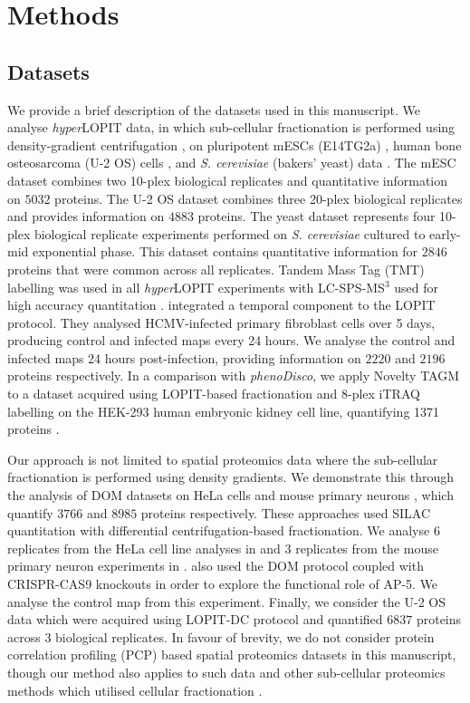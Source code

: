\documentclass[12pt,english]{article}
\begin{document}
\section{Methods}
\subsection{Datasets}
We provide a brief description of the datasets used in this manuscript. We analyse \textit{hyper}LOPIT data, in which sub-cellular fractionation is performed using density-gradient centrifugation \citep{Dunkley:2004, Dunkley:2006, Mulvey:2017}, on pluripotent mESCs (E14TG2a) \citep{hyper}, human bone osteosarcoma (U-2 OS) cells \citep{Thul:2017, DC:2018}, and \textit{S. cerevisiae} (bakers' yeast) data \citep{Nightingale::2019}. The mESC dataset combines two 10-plex biological replicates and quantitative information on $5032$ proteins. The U-2 OS dataset combines three 20-plex biological replicates and provides information on $4883$ proteins. The yeast dataset represents four 10-plex biological replicate experiments performed on \textit{S. cerevisiae} cultured to early-mid exponential phase. This dataset contains quantitative information for $2846$ proteins that were common across all replicates. Tandem Mass Tag (TMT) \citep{Thompson:2003} labelling was used in all \textit{hyper}LOPIT experiments with LC-SPS-MS$^{3}$ used for high accuracy quantitation \citep{Ting:2011, Mcalister::2014}. \cite{Jean_Beltran:2016} integrated a temporal component to the LOPIT protocol. They analysed HCMV-infected primary fibroblast cells over 5 days, producing control and infected maps every 24 hours. We analyse the control and infected maps 24 hours post-infection, providing information on $2220$ and $2196$ proteins respectively. In a comparison with \textit{phenoDisco}, we apply Novelty TAGM to a dataset acquired using LOPIT-based fractionation and 8-plex iTRAQ labelling on the HEK-293 human embryonic kidney cell line, quantifying 1371 proteins \citep{Breckels:2013}.

Our approach is not limited to spatial proteomics data where the sub-cellular fractionation is performed using density gradients. We demonstrate this through the analysis of DOM datasets on HeLa cells and mouse primary neurons \citep{Itzhak:2016, Itzhak::2017}, which quantify $3766$ and $8985$ proteins respectively. These approaches used SILAC quantitation with differential centrifugation-based fractionation. We analyse $6$ replicates from the HeLa cell line analyses in \cite{Itzhak:2016} and $3$ replicates from the mouse primary neuron experiments in \cite{Itzhak::2017}. \cite{Hirst:2018} also used the DOM protocol coupled with CRISPR-CAS9 knockouts in order to explore the functional role of AP-5. We analyse the control map from this experiment. Finally, we consider the U-2 OS data which were acquired using LOPIT-DC protocol \citep{DC:2018} and quantified $6837$ proteins across $3$ biological replicates. In favour of brevity, we do not consider protein correlation profiling (PCP) based spatial proteomics datasets in this manuscript, though our method also applies to such data \citep{Foster:2006, kristensen:2012, kristensen:2014} and other sub-cellular proteomics methods which utilised cellular fractionation \citep{Orre:2019}.
\end{document}
